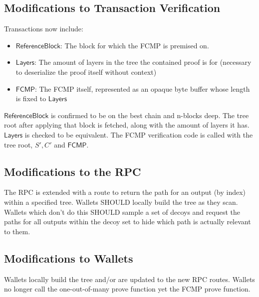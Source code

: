 \documentclass[]{article}
\begin{document}
\subsection{Modifications to Transaction Verification}

Transactions now include:
\begin{itemize}
	\item $\mathsf{ReferenceBlock}$: The block for which the FCMP is premised on.
	\item $\mathsf{Layers}$: The amount of layers in the tree the contained proof is for (necessary to deserialize the proof itself without context)
	\item $\mathsf{FCMP}$: The FCMP itself, represented as an opaque byte buffer whose length is fixed to $\mathsf{Layers}$
\end{itemize}

$\mathsf{ReferenceBlock}$ is confirmed to be on the best chain and n-blocks deep. The tree root after applying that block is fetched, along with the amount of layers it has. $\mathsf{Layers}$ is checked to be equivalent. The FCMP verification code is called with the tree root, $S', C'$ and $\mathsf{FCMP}$.

\subsection{Modifications to the RPC}

The RPC is extended with a route to return the path for an output (by index) within a specified tree. Wallets SHOULD locally build the tree as they scan. Wallets which don't do this SHOULD sample a set of decoys and request the paths for all outputs within the decoy set to hide which path is actually relevant to them.

\subsection{Modifications to Wallets}

Wallets locally build the tree and/or are updated to the new RPC routes. Wallets no longer call the one-out-of-many prove function yet the FCMP prove function.
\end{document}
